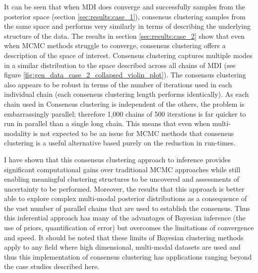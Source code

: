 \documentclass[12pt]{article} %
\begin{document}
	It can be seen that when MDI does converge and successfully samples from the posterior space (section \ref{sec:results:case_1}), consensus clustering samples from the same space and performs very similarly in terms of describing the underlying structure of the data. The results in section \ref{sec:results:case_2} show that even when MCMC methods struggle to converge, consensus clustering offers a description of the space of interest. Consensus clustering captures multiple modes in a similar distribution to the space described across all chains of MDI (see figure \ref{fig:gen_data_case_2_collapsed_violin_plot}). The consensus clustering also appears to be robust in terms of the number of iterations used in each individual chain (each consensus clustering length performs identically). As each chain used in Consensus clustering is independent of the others, the problem is embarrassingly parallel; therefore 1,000 chains of 500 iterations is far quicker to run in parallel than a single long chain. This means that even when multi-modality is not expected to be an issue for MCMC methods that consensus clustering is a useful alternative based purely on the reduction in run-times.
	
	I have shown that this consensus clustering approach to inference provides significant computational gains over traditional MCMC approaches while still enabling meaningful clustering structures to be uncovered and assessments of uncertainty to be performed. Moreover, the results that this approach is better able to explore complex multi-modal posterior distributions as a consequence of the vast number of parallel chains that are used to establish the consensus. Thus this inferential approach has many of the advantages of Bayesian inference (the use of priors, quantification of error) but overcomes the limitations of convergence and speed. It should be noted that these limits of Bayesian clustering methods apply to any field where high dimensional, multi-modal datasets are used and thus this implementation of consensus clustering has applications ranging beyond the case studies described here.
	
	
\end{document}
